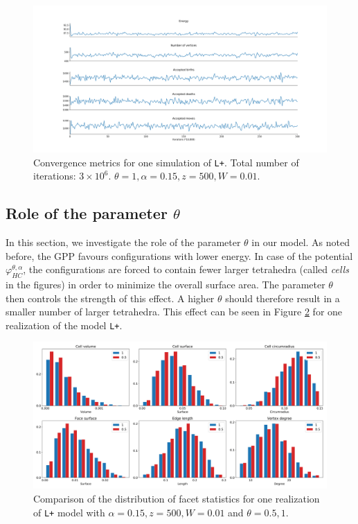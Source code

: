 \begin{figure}
	\includegraphics[width=1\textwidth]{../img/numeric/convergence-1.png}
  \caption{Convergence metrics for one simulation of \texttt{L+}. Total number of iterations: $3\times 10^6$. $\theta = 1, \alpha = 0.15, z = 500, W = 0.01$.}
  \label{fig:convergence}
\end{figure}


\subsection{Role of the parameter $\theta$}
In this section, we investigate the role of the parameter $\theta$ in our model. As noted before, the GPP favours configurations with lower energy. In case of the potential $\varphi^{\theta,\alpha}_{HC}$, the configurations are forced to contain fewer larger tetrahedra (called \textit{cells} in the figures) in order to minimize the overall surface area. The parameter $\theta$ then controls the strength of this effect. A higher $\theta$ should therefore result in a smaller number of larger tetrahedra. This effect can be seen in Figure \ref{fig:thetaeffect} for one realization of the model \texttt{L+}.

\begin{figure}
  \centering
  \includegraphics[width=1\textwidth]{../img/numeric/facets_1_05-1.png}
  \caption{Comparison of the distribution of facet statistics for one realization of \texttt{L+} model with $\alpha=0.15,z=500,W=0.01$ and $\theta = 0.5,1$.  }
  \label{fig:thetaeffect}
\end{figure}


